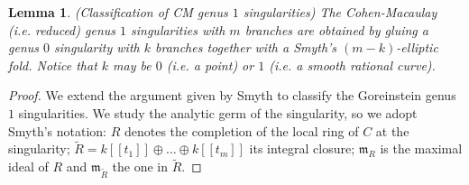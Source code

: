\documentclass[11pt]{amsart}
\theoremstyle{plain}
\newtheorem{lem}[thm]{Lemma}
\theoremstyle{definition}
\begin{document}
\begin{lem}(Classification of CM genus $1$ singularities)
The Cohen-Macaulay (i.e. reduced) genus $1$ singularities with $m$ branches are obtained by gluing a genus $0$ singularity with $k$ branches together with a Smyth's $(m-k)$-elliptic fold.
Notice that $k$ may be $0$ (i.e. a point) or $1$ (i.e. a smooth rational curve).
\end{lem}
\begin{proof}
We extend the argument given by Smyth \cite[Appendix~A]{SMY1} to classify the Goreinstein genus $1$ singularities. We study the analytic germ of the singularity, so we adopt Smyth's notation: $R$ denotes the completion of the local ring of $C$ at the singularity; 
$\widetilde{R}=k[[t_1]]\oplus\dots\oplus k[[t_m]]$ its integral closure; $\mathfrak{m}_R$ is the maximal ideal of $R$  and $\mathfrak{m}_{\widetilde{R}}$ the one in $\widetilde{R}.$


\end{proof}
\end{document}
